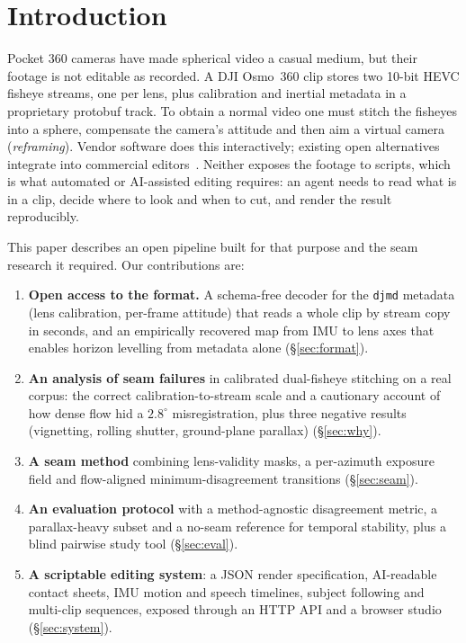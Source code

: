 \documentclass[11pt]{article}
\begin{document}
\section{Introduction}

Pocket 360\textdegree{} cameras have made spherical video a casual medium, but their footage is not editable as recorded.
A DJI Osmo~360 clip stores two 10-bit HEVC fisheye streams, one per lens, plus calibration and inertial metadata in a proprietary protobuf track.
To obtain a normal video one must stitch the fisheyes into a sphere, compensate the camera's attitude and then aim a virtual camera (\emph{reframing}).
Vendor software does this interactively; existing open alternatives integrate into commercial editors~\cite{openosv}.
Neither exposes the footage to scripts, which is what automated or AI-assisted editing requires: an agent needs to read what is in a clip, decide where to look and when to cut, and render the result reproducibly.

This paper describes an open pipeline built for that purpose and the seam research it required.
Our contributions are:
\begin{enumerate}
\item \textbf{Open access to the format.} A schema-free decoder for the \texttt{djmd} metadata (lens calibration, per-frame attitude) that reads a whole clip by stream copy in seconds, and an empirically recovered map from IMU to lens axes that enables horizon levelling from metadata alone (\S\ref{sec:format}).
\item \textbf{An analysis of seam failures} in calibrated dual-fisheye stitching on a real corpus: the correct calibration-to-stream scale and a cautionary account of how dense flow hid a $2.8^\circ$ misregistration, plus three negative results (vignetting, rolling shutter, ground-plane parallax) (\S\ref{sec:why}).
\item \textbf{A seam method} combining lens-validity masks, a per-azimuth exposure field and flow-aligned minimum-disagreement transitions (\S\ref{sec:seam}).
\item \textbf{An evaluation protocol} with a method-agnostic disagreement metric, a parallax-heavy subset and a no-seam reference for temporal stability, plus a blind pairwise study tool (\S\ref{sec:eval}).
\item \textbf{A scriptable editing system}: a JSON render specification, AI-readable contact sheets, IMU motion and speech timelines, subject following and multi-clip sequences, exposed through an HTTP API and a browser studio (\S\ref{sec:system}).
\end{enumerate}
\end{document}

